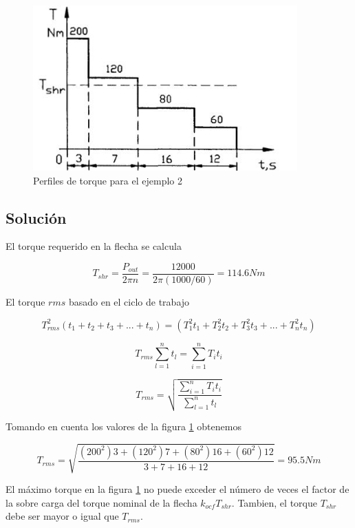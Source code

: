 \documentclass[12pt]{book}
\theoremstyle{definition}
\theoremstyle{remark}
\theoremstyle{plain}
\begin{document}
\begin{figure}
\centering
\includegraphics[width=4in]{perfildetorque.jpg}
\caption{Perfiles de torque para el ejemplo 2}
\label{fig3}
\end{figure}

\subsection{Solución}

El torque requerido en la flecha se calcula

\begin{equation}
\label{equ122}
T_{shr}=\frac{P_{out}}{2 \pi n}=\frac{12000}{2 \pi (1000/60)}=114.6 Nm
\end{equation}

El torque $rms$ basado en el ciclo de trabajo

\begin{equation*}
T_{rms}^2 (t_1+t_2+t_3+...+t_n)  =(T_1^2 t_1+T_2^2 t_2+T_3^2 t_3+...+T_n^2 t_n)
\end{equation*}

\begin{equation*}
T_{rms} \sum_{l=1}^{n} t_l = \sum_{i=1}^{n} T_i t_i
\end{equation*}

\begin{equation}
\label{equ123}
 T_{rms}  = \sqrt{\frac{\sum_{i=1}^{n} T_i t_i}{ \sum_{l=1}^{n} t_l}}
\end{equation}

Tomando en cuenta los valores de la figura \ref{fig3} obtenemos

\begin{equation*}
 T_{rms}  = \sqrt{\frac{(200^2) 3+(120^2) 7 + (80^2) 16 + (60^2) 12 }{ 3+7+16+12}}= 95.5 Nm
\end{equation*}

El máximo torque en la figura \ref{fig3} no puede exceder el número de veces el factor de la sobre carga del torque nominal de la flecha $k_{ocf} T_{shr}$. Tambien, el torque $T_{shr}$  debe  ser mayor o igual que $T_{rms}$.
\end{document}
